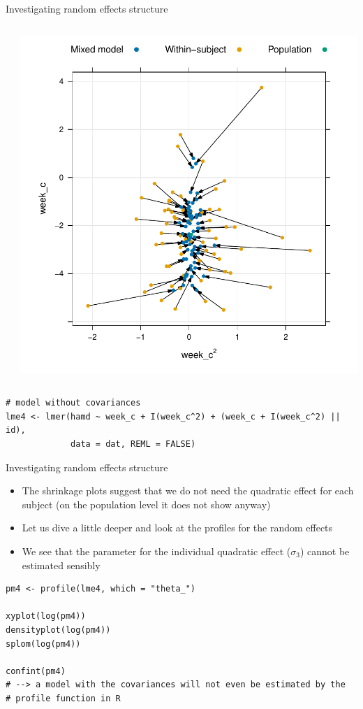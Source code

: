 \documentclass[aspectratio=169]{beamer}
\begin{document}
\begin{frame}[fragile]{Investigating random effects structure}
\begin{columns}
\begin{column}{.35\textwidth}
    \end{column}
    \begin{column}{.35\textwidth}
      \includegraphics[scale=.35]{../figures/hdrs_shrinkage_week-weeksq}
    \end{column}
  \end{columns}
\begin{lstlisting}
# model without covariances
lme4 <- lmer(hamd ~ week_c + I(week_c^2) + (week_c + I(week_c^2) || id),
             data = dat, REML = FALSE)
\end{lstlisting}
\end{frame}

\begin{frame}[fragile]{Investigating random effects structure}
  \begin{itemize}
    \item The shrinkage plots suggest that we do not need the quadratic effect
      for each subject (on the population level it does not show anyway)
    \item Let us dive a little deeper and look at the profiles for the random
      effects
    \item We see that the parameter for the individual quadratic effect
      ($\sigma_3$) cannot be estimated sensibly
  \end{itemize}
\begin{lstlisting}
pm4 <- profile(lme4, which = "theta_")

xyplot(log(pm4))
densityplot(log(pm4))
splom(log(pm4))

confint(pm4)
# --> a model with the covariances will not even be estimated by the
# profile function in R
\end{lstlisting}
\end{frame}
\end{document}
